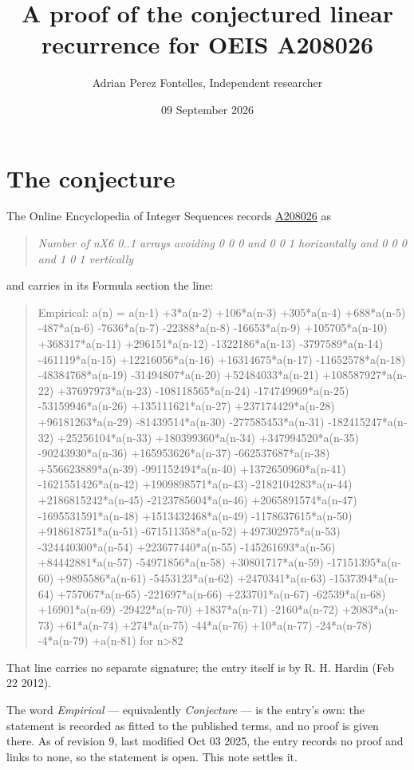 \documentclass[11pt]{article}
\title{A proof of the conjectured linear recurrence for OEIS A208026}
\author{Adrian Perez Fontelles, Independent researcher}
\date{09 September 2026}
\theoremstyle{definition}
\begin{document}
\maketitle
\section{The conjecture}

The Online Encyclopedia of Integer Sequences records \href{https://oeis.org/A208026}{A208026} as

\begin{quote}\itshape Number of nX6 0..1 arrays avoiding 0 0 0 and 0 0 1 horizontally and 0 0 0 and 1 0 1 vertically\end{quote}

and carries in its Formula section the line:

\begin{quote}\ttfamily Empirical: a(n) = a(n-1) +3*a(n-2) +106*a(n-3) +305*a(n-4) +688*a(n-5) -487*a(n-6) -7636*a(n-7) -22388*a(n-8) -16653*a(n-9) +105705*a(n-10) +368317*a(n-11) +296151*a(n-12) -1322186*a(n-13) -3797589*a(n-14) -461119*a(n-15) +12216056*a(n-16) +16314675*a(n-17) -11652578*a(n-18) -48384768*a(n-19) -31494807*a(n-20) +52484033*a(n-21) +108587927*a(n-22) +37697973*a(n-23) -108118565*a(n-24) -174749969*a(n-25) -53159946*a(n-26) +135111621*a(n-27) +237174429*a(n-28) +96181263*a(n-29) -81439514*a(n-30) -277585453*a(n-31) -182415247*a(n-32) +25256104*a(n-33) +180399360*a(n-34) +347994520*a(n-35) -90243930*a(n-36) +165953626*a(n-37) -662537687*a(n-38) +556623889*a(n-39) -991152494*a(n-40) +1372650960*a(n-41) -1621551426*a(n-42) +1909898571*a(n-43) -2182104283*a(n-44) +2186815242*a(n-45) -2123785604*a(n-46) +2065891574*a(n-47) -1695531591*a(n-48) +1513432468*a(n-49) -1178637615*a(n-50) +918618751*a(n-51) -671511358*a(n-52) +497302975*a(n-53) -324440300*a(n-54) +223677440*a(n-55) -145261693*a(n-56) +84442881*a(n-57) -54971856*a(n-58) +30801717*a(n-59) -17151395*a(n-60) +9895586*a(n-61) -5453123*a(n-62) +2470341*a(n-63) -1537394*a(n-64) +757067*a(n-65) -221697*a(n-66) +233701*a(n-67) -62539*a(n-68) +16901*a(n-69) -29422*a(n-70) +1837*a(n-71) -2160*a(n-72) +2083*a(n-73) +61*a(n-74) +274*a(n-75) -44*a(n-76) +10*a(n-77) -24*a(n-78) -4*a(n-79) +a(n-81) for n>82\end{quote}

That line carries no separate signature; the entry itself is by R. H. Hardin (Feb 22 2012).

The word {\itshape Empirical} --- equivalently {\itshape Conjecture} --- is the entry's own: the statement is recorded as fitted to the published terms, and no proof is given there. As of revision 9, last modified Oct 03 2025, the entry records no proof and links to none, so the statement is open. This note settles it.
\end{document}
